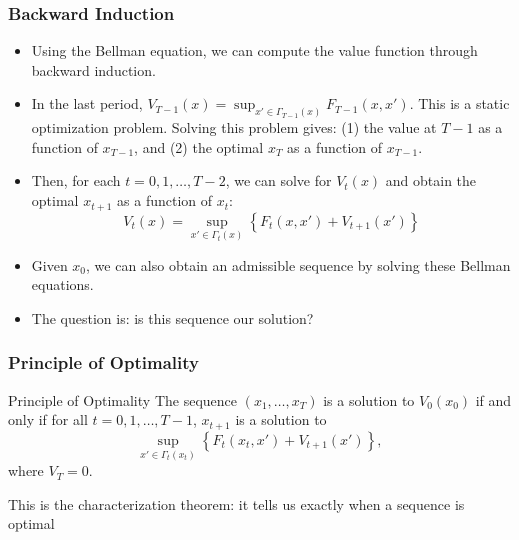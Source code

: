 \documentclass[9pt,aspectratio=169]{beamer}
\begin{document}
\begin{frame}
    \frametitle{Backward Induction}
    \begin{itemize}
        \item Using the Bellman equation, we can compute the value function
        through backward induction.
        \item In the last period, $V_{T-1}(x) = \sup_{x' \in \Gamma_{T-1}(x)}
        F_{T-1}(x, x')$. This is a static optimization problem. Solving this
        problem gives: (1) the value at $T-1$ as a function of $x_{T-1}$, and
        (2) the optimal $x_T$ as a function of $x_{T-1}$.
        \item Then, for each $t = 0, 1, \ldots, T-2$, we can solve for
        $V_t(x)$ and obtain the optimal $x_{t+1}$ as a function of $x_t$:
        \begin{equation*}
            V_{t}(x) = \sup_{x' \in \Gamma_t(x)} \left\{ F_t(x, x')
                + V_{t+1}(x') \right\}
        \end{equation*}
        \item Given $x_0$, we can also obtain an admissible sequence by
        solving these Bellman equations.
        \item The question is: is this sequence our solution?
    \end{itemize}
\end{frame}

\begin{frame}
    \frametitle{Principle of Optimality}
    \begin{block}{Principle of Optimality}
        The sequence $(x_1, \ldots, x_T)$ is a solution to $V_0(x_0)$ if
        and only if for all $t = 0, 1, \ldots, T-1$, $x_{t+1}$ is a solution
        to
        \begin{equation*}
            \sup_{x' \in \Gamma_t(x_t)} \left\{ F_t(x_t, x') + V_{t+1}(x') \right\},
        \end{equation*}
        where $V_T=0$.
    \end{block}
    This is the characterization theorem: it tells us exactly when a sequence
    is optimal

\end{frame}
\end{document}
